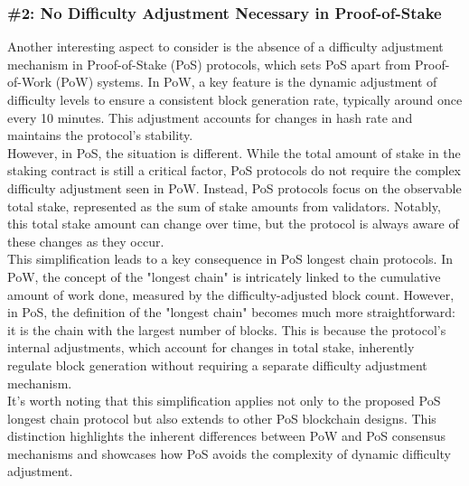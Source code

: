 \subsubsection{\#2: No Difficulty Adjustment Necessary in Proof-of-Stake}
Another interesting aspect to consider is the absence of a difficulty adjustment mechanism in Proof-of-Stake (PoS) protocols, which sets PoS apart from Proof-of-Work (PoW) systems. In PoW, a key feature is the dynamic adjustment of difficulty levels to ensure a consistent block generation rate, typically around once every 10 minutes. This adjustment accounts for changes in hash rate and maintains the protocol's stability.\\
However, in PoS, the situation is different. While the total amount of stake in the staking contract is still a critical factor, PoS protocols do not require the complex difficulty adjustment seen in PoW. Instead, PoS protocols focus on the observable total stake, represented as the sum of stake amounts from validators. Notably, this total stake amount can change over time, but the protocol is always aware of these changes as they occur.\\
This simplification leads to a key consequence in PoS longest chain protocols. In PoW, the concept of the "longest chain" is intricately linked to the cumulative amount of work done, measured by the difficulty-adjusted block count. However, in PoS, the definition of the "longest chain" becomes much more straightforward: it is the chain with the largest number of blocks. This is because the protocol's internal adjustments, which account for changes in total stake, inherently regulate block generation without requiring a separate difficulty adjustment mechanism.\\
It's worth noting that this simplification applies not only to the proposed PoS longest chain protocol but also extends to other PoS blockchain designs. This distinction highlights the inherent differences between PoW and PoS consensus mechanisms and showcases how PoS avoids the complexity of dynamic difficulty adjustment.


